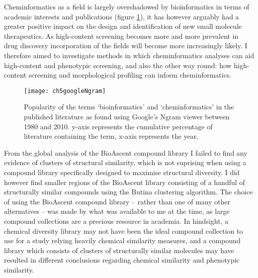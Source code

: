 \documentclass[a4paper,11pt,twoside,openright]{scrbook}
\begin{document}
Cheminformatics as a field is largely overshadowed by bioinformatics in terms of academic interests and publications (figure \ref{figure:informatics_ngram}), it has however arguably had a greater positive impact on the design and identification of new small molecule therapeutics.
As high-content screening becomes more and more prevalent in drug discovery incorporation of the fields will become more increasingly likely.
I therefore aimed to investigate methods in which cheminformatics analyses can aid high-content and phenotypic screening, and also the other way round: how high-content screening and morphological profiling can inform cheminformatics.


\begin{figure}
    \captionsetup{width=0.8\textwidth}
    \caption[Popularity of terms `bioinformatics' and `cheminformatics' in the literature]{
Popularity of the terms `bioinformatics' and `cheminformatics' in the published literature as found using Google's Ngram viewer between 1980 and 2010.
y-axis represents the cumulative percentage of literature containing the term, x-axis represents the year.
}
    \texttt{[image: ch5googleNgram]}
    \label{figure:informatics_ngram}
\end{figure}

From the global analysis of the BioAscent compound library I failed to find any evidence of clusters of structural similarity, which is not suprising when using a compound library specifically designed to maximise structural diversity.
I did however find smaller regions of the BioAscent library consisting of a handful of structurally similar compounds using the Butina clustering algorithm.
The choice of using the BioAscent compound library -- rather than one of many other alternatives -- was made by what was available to me at the time, as large compound collections are a precious resource in academia.
In hindsight, a chemical diversity library may not have been the ideal compound collection to use for a study relying heavily chemical similarity measures, and a compound library which consists of clusters of structurally similar molecules may have resulted in different conclusions regarding chemical similarity and phenotypic similarity.
\end{document}
